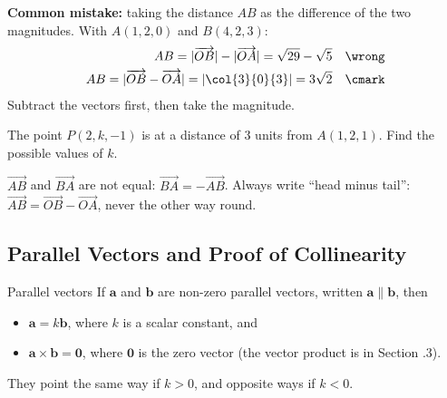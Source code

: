 \begin{mistake}
\textbf{Common mistake:} taking the distance $AB$ as the difference of the two magnitudes. With $A(1,2,0)$ and $B(4,2,3)$:
\begin{align*}
AB = |\overrightarrow{OB}| - |\overrightarrow{OA}| = \sqrt{29} - \sqrt{5} & & \wrong \\
AB = |\overrightarrow{OB} - \overrightarrow{OA}| = \left|\col{3}{0}{3}\right| = 3\sqrt{2} & & \cmark
\end{align*}
Subtract the vectors first, then take the magnitude.
\end{mistake}

\begin{example}[label=ex:1.2]
The point $P(2,k,-1)$ is at a distance of $3$ units from $A(1,2,1)$. Find the possible values of $k$.
\end{example}

\begin{caution}
$\overrightarrow{AB}$ and $\overrightarrow{BA}$ are not equal: $\overrightarrow{BA} = -\overrightarrow{AB}$. Always write ``head minus tail'': $\overrightarrow{AB} = \overrightarrow{OB} - \overrightarrow{OA}$, never the other way round.
\end{caution}

\clearpage
\subsection{Parallel Vectors and Proof of Collinearity}
\begin{definition}{Parallel vectors}
If $\mathbf{a}$ and $\mathbf{b}$ are non-zero parallel vectors, written $\mathbf{a}\parallel\mathbf{b}$, then
\begin{itemize}
  \item $\mathbf{a} = k\mathbf{b}$, where $k$ is a scalar constant, and
  \item $\mathbf{a}\times\mathbf{b} = \mathbf{0}$, where $\mathbf{0}$ is the zero vector (the vector product is in Section \chapnum.3).
\end{itemize}
They point the same way if $k > 0$, and opposite ways if $k < 0$.
\end{definition}

